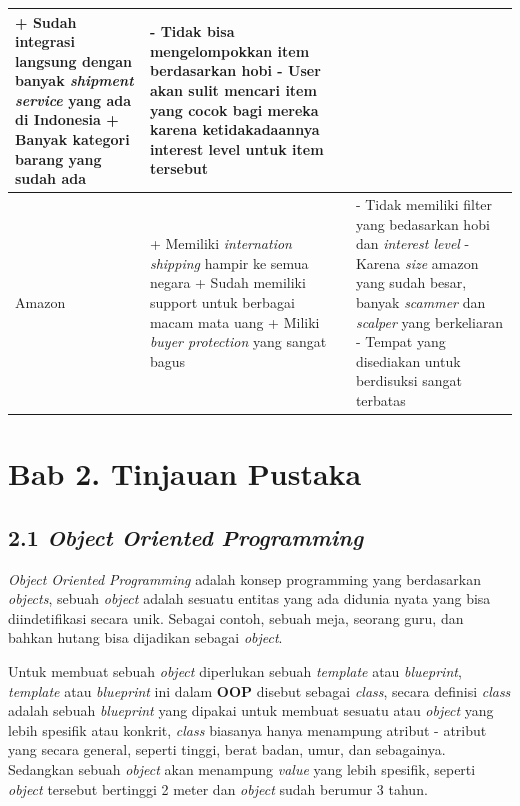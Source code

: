\documentclass[a4paper]{article}
\begin{document}
\begin{longtable}{|m{2cm}|p{5cm}|p{5cm}|}
            + Sudah integrasi langsung dengan banyak \textit{shipment service} yang ada di Indonesia \newline
            + Banyak kategori barang yang sudah ada
        & - Tidak bisa mengelompokkan item berdasarkan hobi \newline
            - User akan sulit mencari item yang cocok bagi mereka karena ketidakadaannya interest level untuk item tersebut \\
    \hline
    Amazon
        & + Memiliki \textit{internation shipping} hampir ke semua negara \newline
            + Sudah memiliki support untuk berbagai macam mata uang \newline
            + Miliki \textit{buyer protection} yang sangat bagus
        & - Tidak memiliki filter yang bedasarkan hobi dan \textit{interest level} \newline
            - Karena \textit{size} amazon yang sudah besar, banyak \textit{scammer} dan \textit{scalper} yang berkeliaran \newline
            - Tempat yang disediakan untuk berdisuksi sangat terbatas\\
    \hline
\end{longtable}

\newpage
\section*{Bab 2. Tinjauan Pustaka}


\subsection*{2.1 \textit{Object Oriented Programming}}
\textit{Object Oriented Programming} adalah konsep programming yang berdasarkan \textit{objects}, sebuah \textit{object} adalah sesuatu entitas yang ada didunia nyata yang bisa diindetifikasi secara unik\autocite{liang_liang_2021}. Sebagai contoh, sebuah meja, seorang guru, dan bahkan hutang bisa dijadikan sebagai \textit{object}.

Untuk membuat sebuah \textit{object} diperlukan sebuah \textit{template} atau \textit{blueprint}, \textit{template} atau \textit{blueprint} ini dalam \textbf{OOP} disebut sebagai \textit{class}, secara definisi \textit{class} adalah sebuah \textit{blueprint} yang dipakai untuk membuat sesuatu atau \textit{object} yang lebih spesifik atau konkrit\autocite{education-erin-oop-2020}, \textit{class} biasanya hanya menampung atribut - atribut yang secara general, seperti tinggi, berat badan, umur, dan sebagainya. Sedangkan sebuah \textit{object} akan menampung \textit{value} yang lebih spesifik, seperti \textit{object} tersebut bertinggi 2 meter dan \textit{object} sudah berumur 3 tahun.
\end{document}
